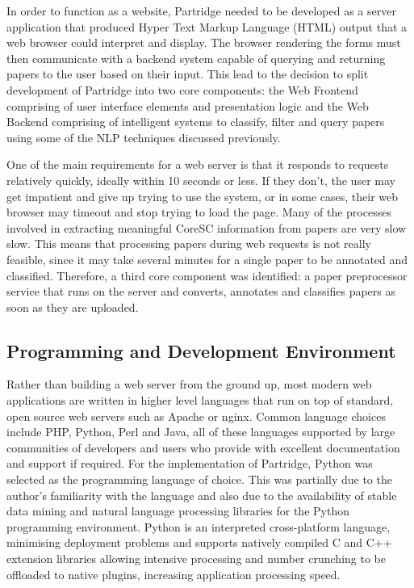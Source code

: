 In order to function as a website, Partridge needed to be developed as a server
application that produced Hyper Text Markup Language (HTML) output that a web
browser could interpret and display. The browser rendering the forms must then
communicate with a backend system capable of querying and returning papers to
the user based on their input. This lead to the decision to split development
of Partridge into two core components: the Web Frontend comprising of user
interface elements and presentation logic and the Web Backend comprising of
intelligent systems to classify, filter and query papers using some of the NLP
techniques discussed previously.

One of the main requirements for a web server is that it responds to requests
relatively quickly, ideally within 10 seconds or less. If they don't, the user
may get impatient and give up trying to use the system, or in some cases, their
web browser may timeout and stop trying to load the page. Many of the processes
involved in extracting meaningful CoreSC information from papers are very slow
slow. This means that processing papers during web requests is not really
feasible, since it may take several minutes for a single paper to be annotated
and classified. Therefore, a third core component was identified: a paper
preprocessor service that runs on the server and converts, annotates and
classifies papers as soon as they are uploaded.

\subsection{ Programming and Development Environment }

Rather than building a web server from the ground up, most modern web
applications are written in higher level languages that run on top of standard,
open source web servers such as Apache or nginx. Common language choices
include PHP, Python, Perl and Java, all of these languages supported by large
communities of developers and users who provide with excellent documentation
and support if required.  For the implementation of Partridge, Python was
selected as the programming language of choice. This was partially due to the
author's familiarity with the language and also due to the availability of
stable data mining\cite{curk05} and natural language
processing\cite{bird2009natural} libraries for the Python programming
environment. Python is an interpreted cross-platform language, minimising
deployment problems and supports natively compiled C and C++ extension
libraries allowing intensive processing  and number crunching to be offloaded
to native plugins, increasing application processing speed.

